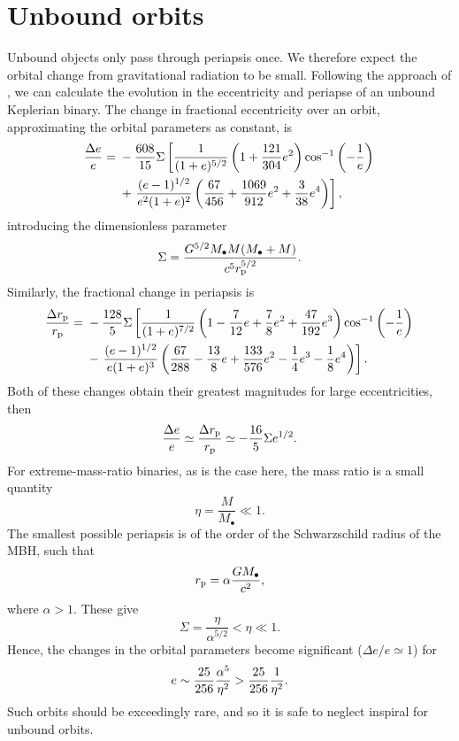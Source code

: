 \section{Unbound orbits}\label{ap:Unbound}

Unbound objects only pass through periapsis once. We therefore expect the orbital change from gravitational radiation to be small. Following the approach of \citet{Turner1977}, we can calculate the evolution in the eccentricity and periapse of an unbound Keplerian binary. The change in fractional eccentricity over an orbit, approximating the orbital parameters as constant, is
\begin{align}
\dfrac{\Delta e}{e} = {} & -\dfrac{608}{15}\Sigma\left[\dfrac{1}{(1+e)^{5/2}}\left(1 + \dfrac{121}{304}e^2\right)\cos^{-1}\left(-\dfrac{1}{e}\right) \right. \nonumber \\*  {} & + \left. \dfrac{(e - 1)^{1/2}}{e^2(1+e)^2}\left(\dfrac{67}{456} + \dfrac{1069}{912}e^2 + \dfrac{3}{38}e^4\right)\right],
\end{align}
introducing the dimensionless parameter
\begin{equation}
\Sigma = \dfrac{G^{5/2}M_\bullet M(M_\bullet+ M)}{c^5r_\mathrm{p}^{5/2}}.
\end{equation}
Similarly, the fractional change in periapsis is
\begin{align}
\dfrac{\Delta r_\mathrm{p}}{r_\mathrm{p}} = {} & -\dfrac{128}{5}\Sigma\left[\dfrac{1}{(1+e)^{7/2}}\left(1 - \dfrac{7}{12}e + \dfrac{7}{8}e^2 + \dfrac{47}{192}e^3\right)\cos^{-1}\left(-\dfrac{1}{e}\right) \right. \nonumber \\*
 {} & - \left. \dfrac{(e - 1)^{1/2}}{e(1 + e)^3}\left(\dfrac{67}{288} - \dfrac{13}{8}e + \dfrac{133}{576}e^2 - \dfrac{1}{4}e^3 - \dfrac{1}{8}e^4\right)\right].
\end{align}
Both of these changes obtain their greatest magnitudes for large eccentricities, then
\begin{equation}
\dfrac{\Delta e}{e} \simeq \dfrac{\Delta r_\mathrm{p}}{r_\mathrm{p}} \simeq -\dfrac{16}{5}\Sigma e^{1/2}.
\end{equation}
For extreme-mass-ratio binaries, as is the case here, the mass ratio is a small quantity
\begin{equation}
\eta = \dfrac{M}{M_\bullet} \ll 1.
\end{equation}
The smallest possible periapsis is of the order of the Schwarzschild radius of the MBH, such that 
\begin{equation}
r_\mathrm{p} = \alpha\dfrac{GM_\bullet}{c^2},
\end{equation}
where $\alpha > 1$. These give
\begin{equation}
\Sigma = \dfrac{\eta}{\alpha^{5/2}} < \eta \ll 1.
\end{equation}
Hence, the changes in the orbital parameters become significant ($\Delta e / e \simeq 1$) for
\begin{equation}
e \sim \dfrac{25}{256}\dfrac{\alpha^5}{\eta^2} > \dfrac{25}{256}\dfrac{1}{\eta^2}.
\end{equation}
Such orbits should be exceedingly rare, and so it is safe to neglect inspiral for unbound orbits.

